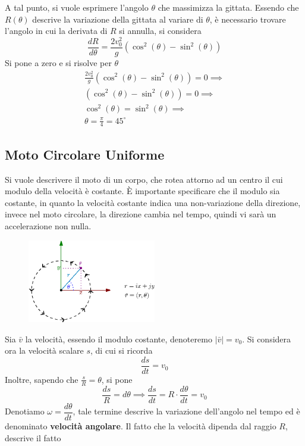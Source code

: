 \documentclass[10pt, letterpaper]{report}
\begin{document}
A tal punto, si vuole esprimere l'angolo $\theta$ che massimizza la gittata. Essendo che $R(\theta)$ descrive 
la variazione della gittata al variare di $\theta$, è necessario trovare l'angolo in cui la derivata 
di $R$ si annulla, si considera 
$$ \frac{dR}{d\theta}=\frac{2v_0^2}{g}(\cos^2(\theta)-\sin^2(\theta))$$
Si pone a zero e si risolve per $\theta$
\begin{eqnarray}
    \frac{2v_0^2}{g}(\cos^2(\theta)-\sin^2(\theta))=0 \implies\\ 
    (\cos^2(\theta)-\sin^2(\theta))=0\implies\\ 
    \cos^2(\theta)=\sin^2(\theta)\implies \\ 
    \theta = \frac{\pi}{4}=45^\circ
\end{eqnarray}
\subsection{Moto Circolare Uniforme}
Si vuole descrivere il moto di un corpo, che rotea attorno ad un centro il cui modulo della 
velocità è costante. È importante specificare che il modulo sia costante, in quanto la velocità 
costante indica una non-variazione della direzione, invece nel moto circolare, la direzione 
cambia nel tempo, quindi vi sarà un accelerazione non nulla.\begin{center}
    \begin{figure}[h!]
        \centering
        \includegraphics[width=0.5\textwidth]{images/motoCircUn.eps}
    \end{figure} 
\end{center}
Sia $\bar v$ la velocità, essendo il modulo costante, denoteremo $|\bar v|=v_0$. Si considera ora 
la velocità scalare $s$, di cui si ricorda 
$$ \frac{ds}{dt}=v_0$$
Inoltre, sapendo che $\frac{s}{R}=\theta$, si pone 
$$ \frac{ds}{R}=d\theta \implies \frac{ds}{dt}=R\cdot \frac{d\theta}{dt}=v_0$$
Denotiamo $\omega = \dfrac{d\theta}{dt}$, tale termine descrive la variazione dell'angolo nel tempo 
ed è denominato \textbf{velocità angolare}. Il fatto che la velocità dipenda dal raggio $R$, descrive il fatto 
\end{document}
